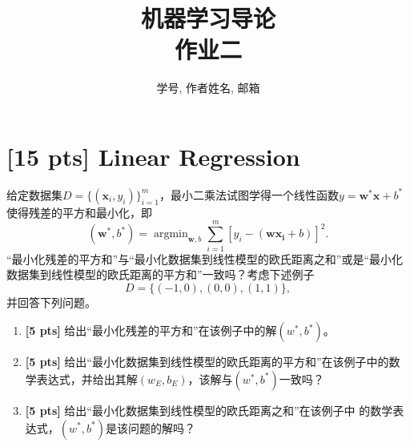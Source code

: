 \documentclass[a4paper,UTF8]{article}
\numberwithin{equation}{section}
\begin{document}
\title{机器学习导论\\
作业二}
\author{学号, 作者姓名, 邮箱}
\maketitle

\section{[15 pts] Linear Regression}
给定数据集$D=\{(\mathbf{x}_i,y_i)\}_{i=1}^m$，最小二乘法试图学得一个线性函数$y=\mathbf{w^*}\mathbf{x}+b^*$使得残差的平方和最小化，即
\begin{equation}
	(\mathbf{w^*},b^*) = \mathop{\arg\min}_{\mathbf{w},b} \sum_{i=1}^m [y_i-(\mathbf{w}\mathbf{x_i}+b)]^2 . 
\end{equation}
“最小化残差的平方和”与“最小化数据集到线性模型的欧氏距离之和”或是“最小化数据集到线性模型的欧氏距离的平方和”一致吗？考虑下述例子
\begin{equation}
	D = \{ (-1,0) , (0,0) , (1,1) \} , 
\end{equation}
并回答下列问题。

\begin{enumerate}[(1)]
	\item \textbf{[5 pts]} 给出“最小化残差的平方和”在该例子中的解$(w^*,b^*)$。
	\item \textbf{[5 pts]} 给出“最小化数据集到线性模型的欧氏距离的平方和”在该例子中的数学表达式，并给出其解$(w_{E},b_{E})$，该解与$(w^*,b^*)$一致吗？
	\item \textbf{[5 pts]} 给出“最小化数据集到线性模型的欧氏距离之和”在该例子中
	的数学表达式，$(w^*,b^*)$是该问题的解吗？
\end{enumerate}
\end{document}
